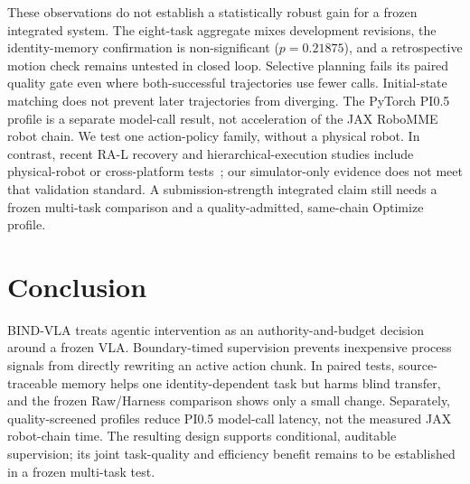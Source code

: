 \documentclass[letterpaper,10pt,conference]{ieeeconf}
\begin{document}
These observations do not establish a statistically robust gain for a
frozen integrated system. The eight-task aggregate mixes development
revisions, the identity-memory confirmation is non-significant
($p=0.21875$), and a retrospective motion check remains untested in
closed loop. Selective planning fails its paired quality gate even where
both-successful trajectories use fewer calls. Initial-state matching
does not prevent later trajectories from diverging. The PyTorch PI0.5
profile is a separate model-call result, not acceleration of the JAX
RoboMME robot chain. We test one action-policy family, without a physical
robot. In contrast, recent RA-L recovery and hierarchical-execution studies
include physical-robot or cross-platform tests~\cite{santhanam2026,gu2026};
our simulator-only evidence does not meet that validation standard. A
submission-strength integrated claim still needs a frozen
multi-task comparison and a quality-admitted, same-chain Optimize profile.

\section{Conclusion}
BIND-VLA treats agentic intervention as an authority-and-budget decision around
a frozen VLA. Boundary-timed supervision prevents inexpensive process signals
from directly rewriting an active action chunk. In paired tests,
source-traceable memory helps one identity-dependent task but harms blind
transfer, and the frozen Raw/Harness comparison shows only a small change.
Separately, quality-screened profiles reduce PI0.5 model-call latency, not
the measured JAX robot-chain time. The resulting design supports
conditional, auditable supervision; its joint task-quality and efficiency
benefit remains to be established in a frozen multi-task test.



\end{document}

